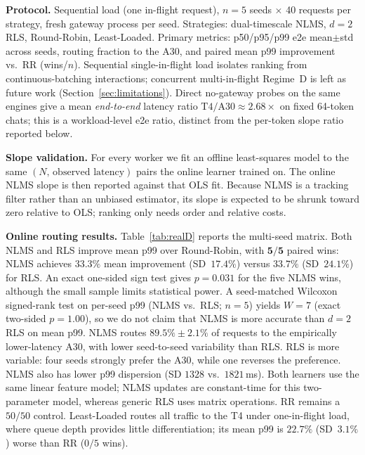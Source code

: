 \documentclass[pdflatex,sn-mathphys-num]{sn-jnl}
\begin{document}
\textbf{Protocol.} Sequential load (one in-flight request), $n{=}5$ seeds $\times$ 40
requests per strategy, fresh gateway process per seed. Strategies: dual-timescale
NLMS, $d{=}2$ RLS, Round-Robin, Least-Loaded. Primary metrics: p50/p95/p99 e2e
mean$\pm$std across seeds, routing fraction to the A30, and paired mean p99
improvement vs.\ RR (wins/$n$). Sequential single-in-flight load isolates ranking
from continuous-batching interactions; concurrent multi-in-flight Regime~D is left
as future work (Section~\ref{sec:limitations}). Direct no-gateway probes on the same
engines give a mean \emph{end-to-end} latency ratio
$\mathrm{T4}/\mathrm{A30}\approx 2.68\times$ on fixed 64-token chats; this is a
workload-level e2e ratio, distinct from the per-token slope ratio reported below.

\textbf{Slope validation.} For every worker we fit an offline least-squares model
to the same $(N,\,\text{observed latency})$ pairs the online learner trained on.
The online NLMS slope is then reported against that OLS fit. Because NLMS is a
tracking filter rather than an unbiased estimator, its slope is expected to be
shrunk toward zero relative to OLS; ranking only needs order and relative costs.

\textbf{Online routing results.}
Table~\ref{tab:realD} reports the multi-seed matrix. Both NLMS and RLS improve mean
p99 over Round-Robin, with $\mathbf{5/5}$ paired wins: NLMS achieves
$\mathbf{33.3\%}$ mean improvement (SD~$17.4\%$) versus $33.7\%$ (SD~$24.1\%$) for
RLS. An exact one-sided sign test gives $p{=}0.031$ for the five NLMS wins, although
the small sample limits statistical power. A seed-matched Wilcoxon signed-rank test
on per-seed p99 (NLMS vs.\ RLS; $n{=}5$) yields $W{=}7$ (exact two-sided
$p{=}1.00$), so we do not claim that NLMS is more accurate than $d{=}2$ RLS on mean
p99. NLMS routes $\mathbf{89.5\%}\pm2.1\%$ of requests to the empirically
lower-latency A30, with lower seed-to-seed variability than RLS. RLS is more
variable: four seeds strongly prefer the A30, while one reverses the preference.
NLMS also has lower p99 dispersion (SD $1328$ vs.\ $1821$\,ms). Both learners use
the same linear feature model; NLMS updates are constant-time for this two-parameter
model, whereas generic RLS uses matrix operations. RR remains a $50/50$ control.
Least-Loaded routes all traffic to the T4 under one-in-flight load, where queue
depth provides little differentiation; its mean p99 is $22.7\%$ (SD~$3.1\%$) worse
than RR ($0/5$ wins).
\end{document}

